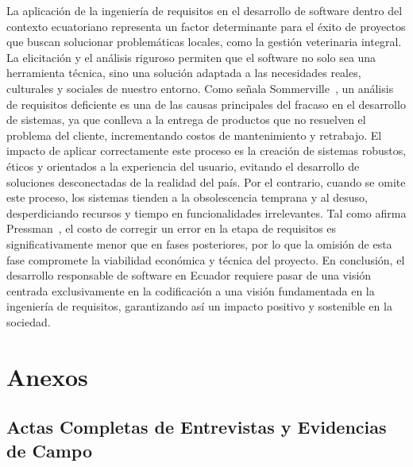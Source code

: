 \documentclass[journal,onecolumn]{IEEEtran}
\begin{document}
La aplicación de la ingeniería de requisitos en el desarrollo de software
dentro del contexto ecuatoriano representa un factor determinante para el
éxito de proyectos que buscan solucionar problemáticas locales, como la
gestión veterinaria integral. La elicitación y el análisis riguroso
permiten que el software no solo sea una herramienta técnica, sino una
solución adaptada a las necesidades reales, culturales y sociales de
nuestro entorno. Como señala Sommerville~\cite{sommerville2018}, un
análisis de requisitos deficiente es una de las causas principales del
fracaso en el desarrollo de sistemas, ya que conlleva a la entrega de
productos que no resuelven el problema del cliente, incrementando costos de
mantenimiento y retrabajo. El impacto de aplicar correctamente este proceso
es la creación de sistemas robustos, éticos y orientados a la experiencia
del usuario, evitando el desarrollo de soluciones desconectadas de la
realidad del país. Por el contrario, cuando se omite este proceso, los
sistemas tienden a la obsolescencia temprana y al desuso, desperdiciando
recursos y tiempo en funcionalidades irrelevantes. Tal como afirma
Pressman~\cite{pressman2010}, el costo de corregir un error en la etapa de
requisitos es significativamente menor que en fases posteriores, por lo que
la omisión de esta fase compromete la viabilidad económica y técnica del
proyecto. En conclusión, el desarrollo responsable de software en Ecuador
requiere pasar de una visión centrada exclusivamente en la codificación a
una visión fundamentada en la ingeniería de requisitos, garantizando así un
impacto positivo y sostenible en la sociedad.

\newpage


\printbibliography[heading=bibnumbered, title={Referencias}]

\newpage

\section{Anexos}

\subsection{Actas Completas de Entrevistas y Evidencias de Campo}
\label{app:entrevistas}
\end{document}

